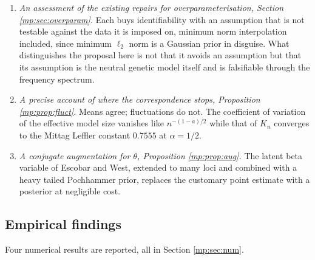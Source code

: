 \begin{enumerate}[leftmargin=1.8em,itemsep=3pt]
proposal is internal to Fisher's formulation rather than imported.
\item \emph{An assessment of the existing repairs for overparameterisation, Section
\ref{mp:sec:overparam}.} Each buys identifiability with an assumption that is not testable
against the data it is imposed on, minimum norm interpolation included, since minimum
$\ell_2$ norm is a Gaussian prior in disguise. What distinguishes the proposal here is not
that it avoids an assumption but that its assumption is the neutral genetic model itself and
is falsifiable through the frequency spectrum.
\item \emph{A precise account of where the correspondence stops, Proposition
\ref{mp:prop:fluct}.} Means agree; fluctuations do not. The coefficient of variation of the
effective model size vanishes like $n^{-(1-a)/2}$ while that of $K_n$ converges to the
Mittag Leffler constant $0.7555$ at $\alpha=1/2$.
\item \emph{A conjugate augmentation for $\theta$, Proposition \ref{mp:prop:aug}.} The latent
beta variable of Escobar and West, extended to many loci and combined with a heavy tailed
Pochhammer prior, replaces the customary point estimate with a posterior at negligible cost.
\end{enumerate}

\subsection{Empirical findings}
\label{mp:sec:findings}

Four numerical results are reported, all in Section \ref{mp:sec:num}.

